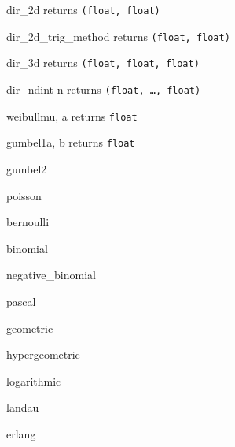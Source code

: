 \begin{methoddesc}{dir\_2d}{}
\hfill returns {\tt (float, float)}
\end{methoddesc}
\begin{methoddesc}{dir\_2d\_trig\_method}{}
\hfill returns {\tt (float, float)}
\end{methoddesc}
\begin{methoddesc}{dir\_3d}{}
\hfill returns {\tt (float, float, float)}
\end{methoddesc}
\begin{methoddesc}{dir\_nd}{int n}
\hfill returns {\tt (float, \dots, float)}
\end{methoddesc}
\begin{methoddesc}{weibull}{mu, a}
\hfill returns {\tt float}
\end{methoddesc}
\begin{methoddesc}{gumbel1}{a, b}
\hfill returns {\tt float}
\end{methoddesc}
\begin{methoddesc}{gumbel2}{}
\end{methoddesc}
\begin{methoddesc}{poisson}{}
\end{methoddesc}
\begin{methoddesc}{bernoulli}{}
\end{methoddesc}
\begin{methoddesc}{binomial}{}
\end{methoddesc}
\begin{methoddesc}{negative\_binomial}{}
\end{methoddesc}
\begin{methoddesc}{pascal}{}
\end{methoddesc}
\begin{methoddesc}{geometric}{}
\end{methoddesc}
\begin{methoddesc}{hypergeometric}{}
\end{methoddesc}
\begin{methoddesc}{logarithmic}{}
\end{methoddesc}
\begin{methoddesc}{landau}{}
\end{methoddesc}
\begin{methoddesc}{erlang}{}
\end{methoddesc}


